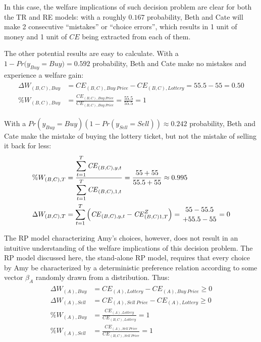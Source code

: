 \documentclass[11pt,a4paper]{article}
\newcommand\CE{\ensuremath{\mathit{CE}}}  %
\newcommand\Prob{\ensuremath{\mathit{Pr}}}  %
\begin{document}
In this case, the welfare implications of such decision problem are clear for both the TR and RE  models: with a roughly $0.167$ probability, Beth and Cate will make 2 consecutive \enquote{mistakes} or \enquote{choice errors}, which results in 1 unit of money and 1 unit of {\CE} being extracted from each of them.

The other potential results are easy to calculate.
With a ${1- {\Prob}(y_{\mathit{Buy}}} = \mathit{Buy}) = 0.592$ probability, Beth and Cate make no mistakes and experience a welfare gain:
\begin{align}
	\begin{split}
		\Delta W_{(B,C),\mathit{Buy}} &= {\CE}_{(B,C),\mathit{Buy\ Price}} - {\CE}_{(B,C),\mathit{Lottery}} = 55.5 - 55 = 0.50\\
		\% W_{(B,C),\mathit{Buy}} &= \frac{{\CE}_{(B,C),\mathit{Buy\ Price}}}{{\CE}_{(B,C),\mathit{Buy\ Price}}} = \frac{55.5}{55.5} = 1
	\end{split}
\end{align}

With a $ {\Prob}(y_{\mathit{Buy}} = \mathit{Buy})(1 - {\Prob}(y_{\mathit{Sell}}= \mathit{Sell})) \approx 0.242$ probability, Beth and Cate make the mistake of buying the lottery ticket, but not the mistake of selling it back for less:
\begin{align}
	\begin{split}
		\%W_{(B,C),T} &= \frac{\displaystyle\sum_{t=1}^{T} {\CE}_{(B,C),y,t} }{\displaystyle\sum_{t=1}^{T} {\CE}_{(B,C),1,t}} = \frac{55 + 55}{55.5 + 55} \approx 0.995 \\
		\Delta W_{(B,C),T} &= \sum_{t=1}^T \left( {\CE}_{(B,C),y,t} - {\CE}_{(B,C)1,T}^Z \right)= \genfrac{}{}{0pt}{}{55 - 55.5}{+ 55.5 - 55} = 0
	\end{split}
\end{align}

The RP model characterizing Amy's choices, however, does not result in an intuitive understanding of the welfare implications of this decision problem.
The RP model discussed here, the stand-alone RP model, requires that every choice by Amy be characterized by a deterministic preference relation according to some vector $\beta_A$ randomly drawn from a distribution.
Thus:
\begin{align}
	\label{eq:RP.welfare}
	\begin{split}
		\Delta W_{(A),\mathit{Buy}} &= {\CE}_{(A),\mathit{Lottery}} - {\CE}_{(A),\mathit{Buy\ Price}} \geq 0\\
		\Delta W_{(A),\mathit{Sell}} &= {\CE}_{(A),\mathit{Sell\ Price}} - {\CE}_{(A),\mathit{Lottery}} \geq 0\\
		\% W_{(A),\mathit{Buy}} &= \frac{{\CE}_{(A),\mathit{Lottery}}}{{\CE}_{(B,C),\mathit{Lottery}}} = 1\\
		\% W_{(A),\mathit{Sell}} &= \frac{{\CE}_{(A),\mathit{Sell\ Price}}}{{\CE}_{(B,C),\mathit{Sell\ Price}}} = 1
	\end{split}
\end{align}
\end{document}
